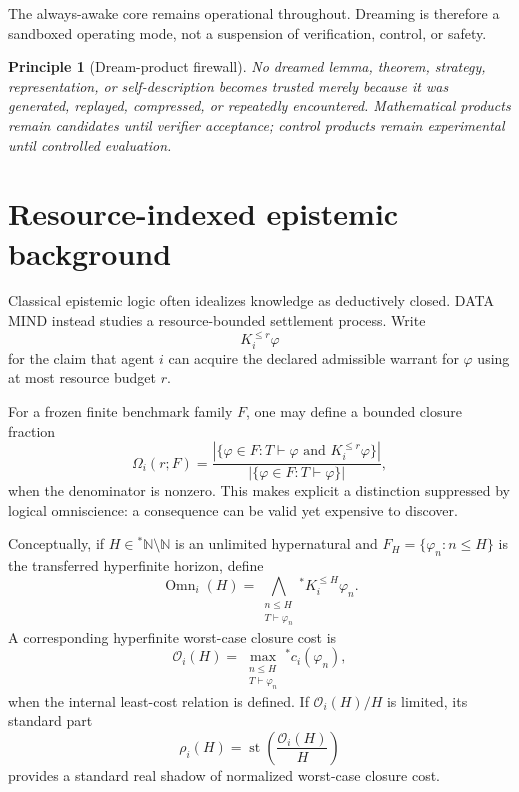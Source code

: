 \documentclass[11pt]{article}
\newtheorem{principle}[definition]{Principle}
\newcommand{\st}{\operatorname{st}}
\newcommand{\Omn}{\operatorname{Omn}}
\begin{document}
The always-awake core remains operational throughout. Dreaming is therefore a sandboxed operating mode, not a suspension of verification, control, or safety.

\begin{principle}[Dream-product firewall]
No dreamed lemma, theorem, strategy, representation, or self-description becomes trusted merely because it was generated, replayed, compressed, or repeatedly encountered. Mathematical products remain candidates until verifier acceptance; control products remain experimental until controlled evaluation.
\end{principle}

\section{Resource-indexed epistemic background}

Classical epistemic logic often idealizes knowledge as deductively closed. DATA MIND instead studies a resource-bounded settlement process. Write
\begin{equation}
K_i^{\le r}\varphi
\end{equation}
for the claim that agent $i$ can acquire the declared admissible warrant for $\varphi$ using at most resource budget $r$.

For a frozen finite benchmark family $F$, one may define a bounded closure fraction
\begin{equation}
\Omega_i(r;F)=
\frac{\left|\{\varphi\in F:T\vdash\varphi\text{ and }K_i^{\le r}\varphi\}\right|}
{\left|\{\varphi\in F:T\vdash\varphi\}\right|},
\end{equation}
when the denominator is nonzero. This makes explicit a distinction suppressed by logical omniscience: a consequence can be valid yet expensive to discover.

Conceptually, if $H\in{}^*\mathbb N\setminus\mathbb N$ is an unlimited hypernatural and $F_H=\{\varphi_n:n\le H\}$ is the transferred hyperfinite horizon, define
\begin{equation}
\Omn_i(H)=
\bigwedge_{\substack{n\le H\\T\vdash\varphi_n}}
{}^*K_i^{\le H}\varphi_n.
\end{equation}
A corresponding hyperfinite worst-case closure cost is
\begin{equation}
\mathcal O_i(H)=
\max_{\substack{n\le H\\T\vdash\varphi_n}}
{}^*c_i(\varphi_n),
\end{equation}
when the internal least-cost relation is defined. If $\mathcal O_i(H)/H$ is limited, its standard part
\begin{equation}
\rho_i(H)=\st\!\left(\frac{\mathcal O_i(H)}{H}\right)
\end{equation}
provides a standard real shadow of normalized worst-case closure cost.
\end{document}
